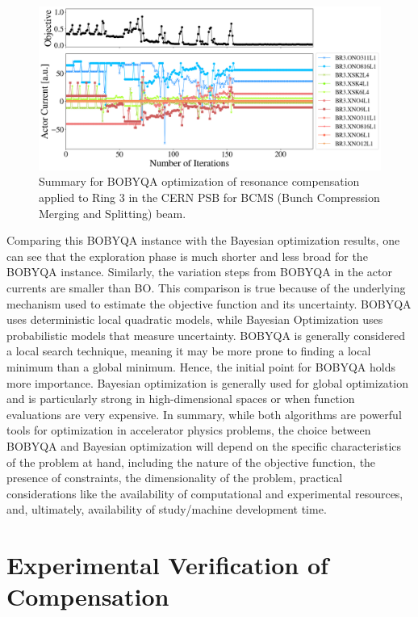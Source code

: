 \begin{figure}[H]
    \centering
    \includegraphics[width=\linewidth]{chapter5/2023_05_04_R3_BCMS_bobyqa.png}
    \caption{Summary for BOBYQA optimization of resonance compensation applied to Ring 3 in the CERN PSB for BCMS (Bunch Compression Merging and Splitting) beam.}
    \label{fig:bobyqa1}
   \vspace{-1.25em}
\end{figure}

Comparing this BOBYQA instance with the Bayesian optimization results, one can see that the exploration phase is much shorter and less broad for the BOBYQA instance. Similarly, the variation steps from BOBYQA in the actor currents are smaller than BO. This comparison is true because of the underlying mechanism used to estimate the objective function and its uncertainty. BOBYQA uses deterministic local quadratic models, while Bayesian Optimization uses probabilistic models that measure uncertainty. BOBYQA is generally considered a local search technique, meaning it may be more prone to finding a local minimum than a global minimum. Hence, the initial point for BOBYQA holds more importance. Bayesian optimization is generally used for global optimization and is particularly strong in high-dimensional spaces or when function evaluations are very expensive. In summary, while both algorithms are powerful tools for optimization in accelerator physics problems, the choice between BOBYQA and Bayesian optimization will depend on the specific characteristics of the problem at hand, including the nature of the objective function, the presence of constraints, the dimensionality of the problem, practical considerations like the availability of computational and experimental resources, and, ultimately, availability of study/machine development time.  

\section{Experimental Verification of Compensation}

